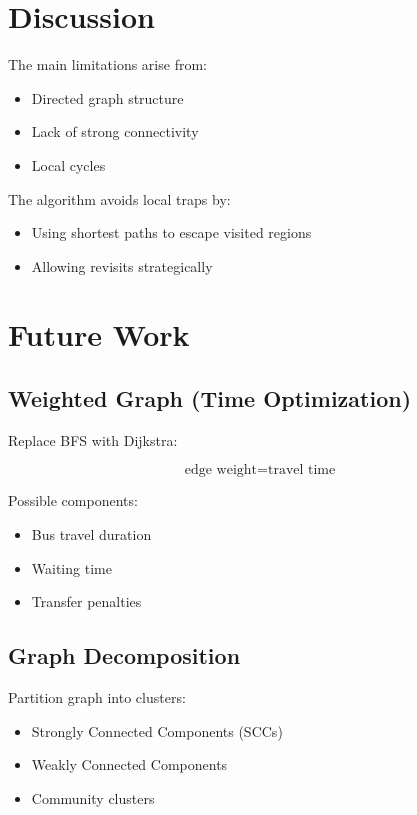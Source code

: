 \documentclass[11pt]{article}
\begin{document}
\section{Discussion}

The main limitations arise from:

\begin{itemize}
    \item Directed graph structure
    \item Lack of strong connectivity
    \item Local cycles
\end{itemize}

The algorithm avoids local traps by:

\begin{itemize}
    \item Using shortest paths to escape visited regions
    \item Allowing revisits strategically
\end{itemize}

\section{Future Work}

\subsection*{Weighted Graph (Time Optimization)}

Replace BFS with Dijkstra:

\[
\text{edge weight} = \text{travel time}
\]

Possible components:

\begin{itemize}
    \item Bus travel duration
    \item Waiting time
    \item Transfer penalties
\end{itemize}

\subsection*{Graph Decomposition}

Partition graph into clusters:

\begin{itemize}
    \item Strongly Connected Components (SCCs)
    \item Weakly Connected Components
    \item Community clusters
\end{itemize}
\end{document}
